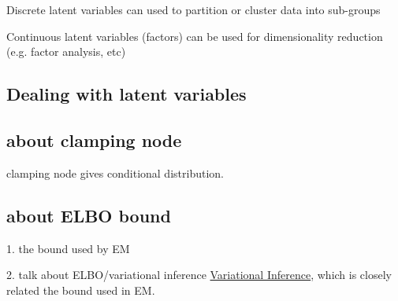 Discrete latent variables can used to partition or cluster data into sub-groups

Continuous latent variables (factors) can be used for dimensionality reduction (e.g. factor analysis, etc)
\subsection{Dealing with latent variables}
\subsection{about clamping node}
clamping node gives conditional distribution.

\subsection{about ELBO bound}
1. the bound used by EM

2. talk about ELBO/variational inference \href{https://media.nips.cc/Conferences/2016/Slides/6199-Slides.pdf}{Variational Inference}, which is closely related the bound used in EM.

